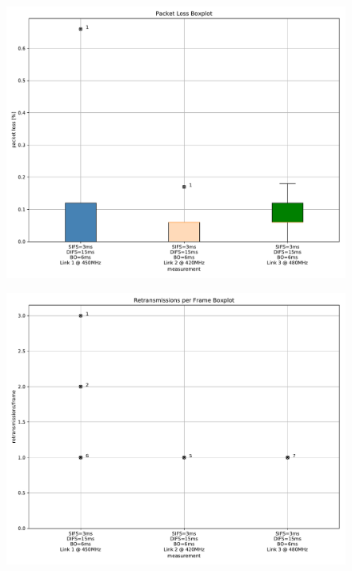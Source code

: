 \documentclass{article}
\begin{document}
\begin{figure}
	\includegraphics[width=\textwidth]{rb_high_single/boxplot/packet_loss_boxplot}
\end{figure}

\begin{figure}
	\includegraphics[width=\textwidth]{rb_high_single/boxplot/retransmissions_per_frame_boxplot}
\end{figure}
\end{document}
